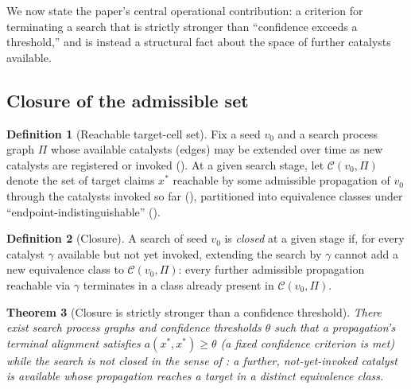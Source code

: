 \documentclass[11pt,twocolumn,a4paper]{article}
\theoremstyle{thmstyle}
\newtheorem{theorem}{Theorem}[section]
\theoremstyle{definition}
\newtheorem{definition}[theorem]{Definition}
\theoremstyle{remark}
\newcommand{\Proc}{\Pi}
\newcommand{\Cell}{\mathcal{C}}
\begin{document}
We now state the paper's central operational contribution: a criterion for
terminating a search that is strictly stronger than ``confidence exceeds a
threshold,'' and is instead a structural fact about the space of further
catalysts available.

\subsection{Closure of the admissible set}

\begin{definition}[Reachable target-cell set]
\label{def:reachable}
Fix a seed $v_0$ and a search process graph $\Proc$ whose available
catalysts (edges) may be extended over time as new catalysts are
registered or invoked (). At a given search stage,
let $\Cell(v_0,\Proc)$ denote the set of target claims $x^{\ast}$ reachable
by some admissible propagation of $v_0$ through the catalysts invoked so
far (), partitioned into equivalence
classes under ``endpoint-indistinguishable'' ().
\end{definition}

\begin{definition}[Closure]
\label{def:closure}
A search of seed $v_0$ is \emph{closed} at a given stage if, for every
catalyst $\gamma$ available but not yet invoked, extending the search by
$\gamma$ cannot add a new equivalence class to $\Cell(v_0,\Proc)$: every
further admissible propagation reachable via $\gamma$ terminates in a
class already present in $\Cell(v_0,\Proc)$.
\end{definition}

\begin{theorem}[Closure is strictly stronger than a confidence threshold]
\label{thm:closure-stronger}
There exist search process graphs and confidence thresholds $\theta$ such
that a propagation's terminal alignment satisfies $a(x^{\ast},x^{\ast})
\ge\theta$ (a fixed confidence criterion is met) while the search is not
closed in the sense of : a further, not-yet-invoked
catalyst is available whose propagation reaches a target in a distinct
equivalence class.
\end{theorem}
\end{document}
